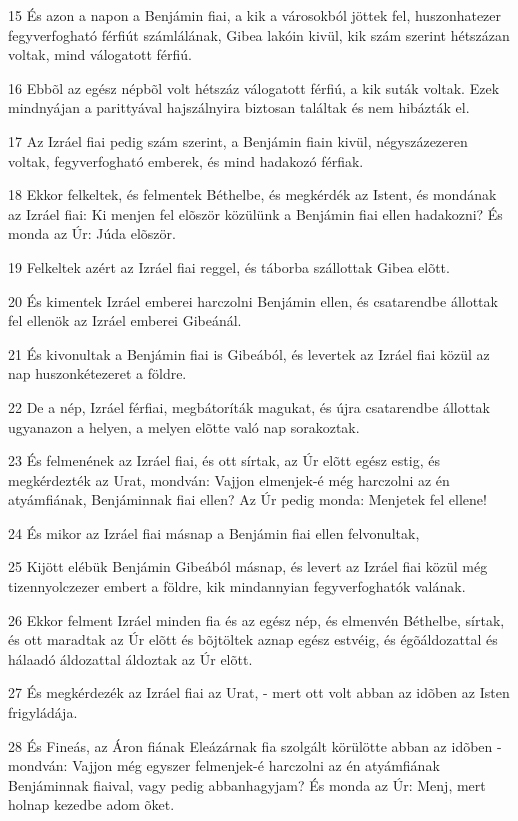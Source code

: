 \par 15 És azon a napon a Benjámin fiai, a kik a városokból jöttek fel, huszonhatezer fegyverfogható férfiút számlálának, Gibea lakóin kivül, kik szám szerint hétszázan voltak, mind válogatott férfiú.
\par 16 Ebbõl az egész népbõl volt hétszáz válogatott férfiú, a kik suták voltak. Ezek mindnyájan a parittyával hajszálnyira biztosan találtak és nem hibázták el.
\par 17 Az Izráel fiai pedig szám szerint, a Benjámin fiain kivül, négyszázezeren voltak, fegyverfogható emberek, és mind hadakozó férfiak.
\par 18 Ekkor felkeltek, és felmentek Béthelbe, és megkérdék az Istent, és mondának az Izráel fiai: Ki menjen fel elõször közülünk a Benjámin fiai ellen hadakozni? És monda az Úr: Júda elõször.
\par 19 Felkeltek azért az Izráel fiai reggel, és táborba szállottak Gibea elõtt.
\par 20 És kimentek Izráel emberei harczolni Benjámin ellen, és csatarendbe állottak fel ellenök az Izráel emberei Gibeánál.
\par 21 És kivonultak a Benjámin fiai is Gibeából, és levertek az Izráel fiai közül az nap huszonkétezeret a földre.
\par 22 De a nép, Izráel férfiai, megbátoríták magukat, és újra csatarendbe állottak ugyanazon a helyen, a melyen elõtte való nap sorakoztak.
\par 23 És felmenének az Izráel fiai, és ott sírtak, az Úr elõtt egész estig, és megkérdezték az Urat, mondván: Vajjon elmenjek-é még harczolni az én atyámfiának, Benjáminnak fiai ellen? Az Úr pedig monda: Menjetek fel ellene!
\par 24 És mikor az Izráel fiai másnap a Benjámin fiai ellen felvonultak,
\par 25 Kijött elébük Benjámin Gibeából másnap, és levert az Izráel fiai közül még tizennyolczezer embert a földre, kik mindannyian fegyverfoghatók valának.
\par 26 Ekkor felment Izráel minden fia és az egész nép, és elmenvén Béthelbe, sírtak, és ott maradtak az Úr elõtt és bõjtöltek aznap egész estvéig, és égõáldozattal és hálaadó áldozattal áldoztak az Úr elõtt.
\par 27 És megkérdezék az Izráel fiai az Urat, - mert ott volt abban az idõben az Isten frigyládája.
\par 28 És Fineás, az Áron fiának Eleázárnak fia szolgált körülötte abban az idõben - mondván: Vajjon még egyszer felmenjek-é harczolni az én atyámfiának Benjáminnak fiaival, vagy pedig abbanhagyjam? És monda az Úr: Menj, mert holnap kezedbe adom õket.

